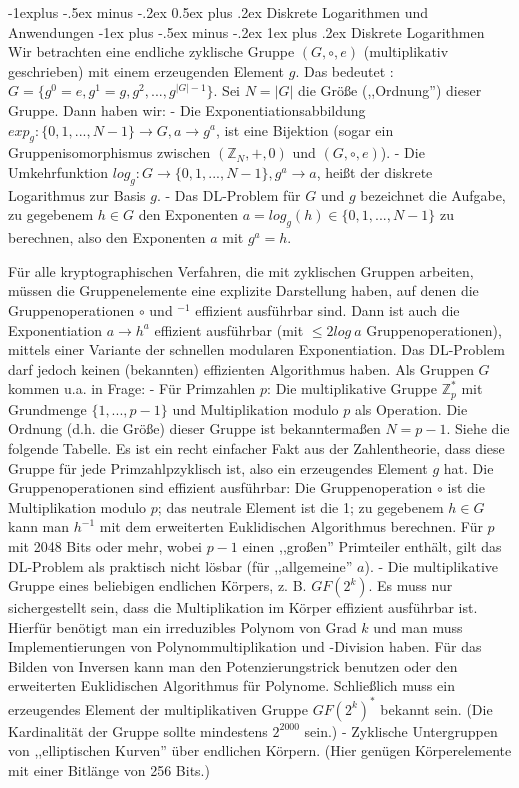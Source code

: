 \documentclass[a4paper]{article}
\makeatletter
\renewcommand{\subsection}{\@startsection{subsection}{2}{0mm}%
 {-1explus -.5ex minus -.2ex}%
 {0.5ex plus .2ex}%
 {\normalfont\normalsize\bfseries}}
\renewcommand{\subsubsection}{\@startsection{subsubsection}{3}{0mm}%
 {-1ex plus -.5ex minus -.2ex}%
 {1ex plus .2ex}%
 {\normalfont\small\bfseries}}
\makeatother
\begin{document}
\begin{multicols}{3}
        \subsection{Diskrete Logarithmen und Anwendungen}
        \subsubsection{Diskrete Logarithmen}
        Wir betrachten eine endliche zyklische Gruppe $(G,\circ,e)$ (multiplikativ geschrieben) mit einem erzeugenden Element $g$. Das bedeutet : $G=\{g^0=e,g^1=g,g^2,...,g^{|G|- 1}\}$. Sei $N=|G|$ die Größe (,,Ordnung'') dieser Gruppe. Dann haben wir:
        - Die Exponentiationsabbildung $exp_g:\{0,1,...,N-1\}\rightarrow G, a\rightarrow g^a$, ist eine Bijektion (sogar ein Gruppenisomorphismus zwischen $(\mathbb{Z}_N,+,0)$ und $(G,\circ,e)$).
        - Die Umkehrfunktion $log_g:G\rightarrow\{0,1,...,N-1\},g^a\rightarrow a$, heißt der diskrete Logarithmus zur Basis $g$.
        - Das DL-Problem für $G$ und $g$ bezeichnet die Aufgabe, zu gegebenem $h\in G$ den Exponenten $a=log_g (h) \in\{0,1,...,N-1\}$ zu berechnen, also den Exponenten $a$ mit $g^a=h$.

        Für alle kryptographischen Verfahren, die mit zyklischen Gruppen arbeiten, müssen die Gruppenelemente eine explizite Darstellung haben, auf denen die Gruppenoperationen $\circ$ und $^{-1}$ effizient ausführbar sind.
        Dann ist auch die Exponentiation $a\rightarrow h^a$ effizient ausführbar (mit $\leq 2 log\ a$ Gruppenoperationen), mittels einer Variante der schnellen modularen Exponentiation. Das DL-Problem darf jedoch keinen (bekannten) effizienten Algorithmus haben.
        Als Gruppen $G$ kommen u.a. in Frage:
        - Für Primzahlen $p$: Die multiplikative Gruppe $\mathbb{Z}^*_p$ mit Grundmenge $\{1,...,p-1\}$ und Multiplikation modulo $p$ als Operation. Die Ordnung (d.h. die Größe) dieser Gruppe ist bekanntermaßen $N=p-1$. Siehe die folgende Tabelle. Es ist ein recht einfacher Fakt aus der Zahlentheorie, dass diese Gruppe für jede Primzahlpzyklisch ist, also ein erzeugendes Element $g$ hat. Die Gruppenoperationen sind effizient ausführbar: Die Gruppenoperation $\circ$ ist die Multiplikation modulo $p$; das neutrale Element ist die 1; zu gegebenem $h\in G$ kann man $h^{-1}$ mit dem erweiterten Euklidischen Algorithmus berechnen. Für $p$ mit 2048 Bits oder mehr, wobei $p-1$ einen ,,großen'' Primteiler enthält, gilt das DL-Problem als praktisch nicht lösbar (für ,,allgemeine'' $a$).
        - Die multiplikative Gruppe eines beliebigen endlichen Körpers, z. B. $GF(2^k)$. Es muss nur sichergestellt sein, dass die Multiplikation im Körper effizient ausführbar ist. Hierfür benötigt man ein irreduzibles Polynom von Grad $k$ und man muss Implementierungen von Polynommultiplikation und -Division haben. Für das Bilden von Inversen kann man den Potenzierungstrick benutzen oder den erweiterten Euklidischen Algorithmus für Polynome. Schließlich muss ein erzeugendes Element der multiplikativen Gruppe $GF(2^k)^*$ bekannt sein. (Die Kardinalität der Gruppe sollte mindestens $2^{2000}$ sein.)
        - Zyklische Untergruppen von ,,elliptischen Kurven'' über endlichen Körpern. (Hier genügen Körperelemente mit einer Bitlänge von 256 Bits.)


\end{multicols}
\end{document}
